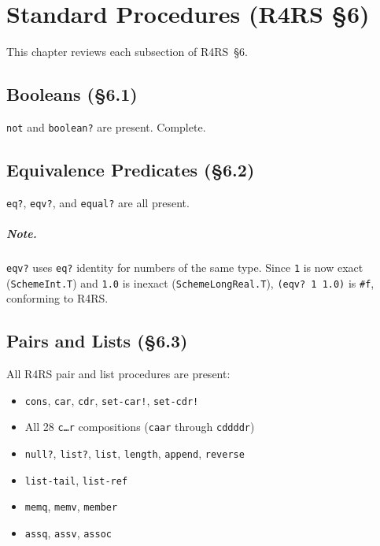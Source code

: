 \documentclass[12pt]{report}
\begin{document}
\chapter{Standard Procedures (R4RS \S6)}

This chapter reviews each subsection of R4RS~\S6.

\section{Booleans (\S6.1)}

{\tt not} and {\tt boolean?} are present.  Complete.

\section{Equivalence Predicates (\S6.2)}

{\tt eq?}, {\tt eqv?}, and {\tt equal?} are all present.

\paragraph{Note.} {\tt eqv?} uses {\tt eq?} identity for numbers of the
same type.  Since {\tt 1} is now exact ({\tt SchemeInt.T}) and {\tt 1.0}
is inexact ({\tt SchemeLongReal.T}), {\tt (eqv?\ 1\ 1.0)} is {\tt \#f},
conforming to R4RS.

\section{Pairs and Lists (\S6.3)}

All R4RS pair and list procedures are present:

\begin{itemize}[nosep]
\item {\tt cons}, {\tt car}, {\tt cdr}, {\tt set-car!}, {\tt set-cdr!}
\item All 28 {\tt c\ldots r} compositions ({\tt caar} through {\tt cddddr})
\item {\tt null?}, {\tt list?}, {\tt list}, {\tt length}, {\tt append},
  {\tt reverse}
\item {\tt list-tail}, {\tt list-ref}
\item {\tt memq}, {\tt memv}, {\tt member}
\item {\tt assq}, {\tt assv}, {\tt assoc}
\end{itemize}
\end{document}
